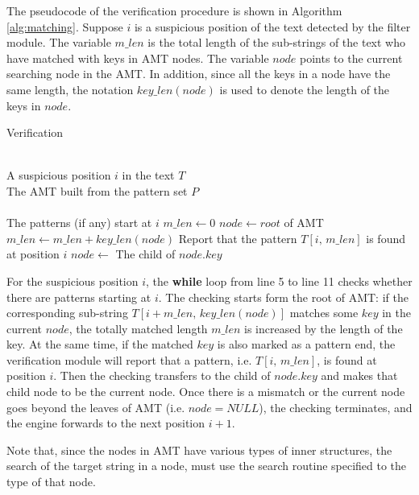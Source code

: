 \documentclass{article}
\begin{document}
The pseudocode of the verification procedure is shown in Algorithm
\ref{alg:matching}. Suppose $i$ is a suspicious position of the text
detected by the filter module. The variable $m\_len$ is the total
length of the sub-strings of the text who have matched with keys in
AMT nodes. The variable $node$ points to the current searching node in
the AMT. In addition, since all the keys in a node have the same
length, the notation $key\_len(node)$ is used to denote the length of
the keys in $node$.

\begin{algorithm}
  \caption{Verification}\scriptsize
  \label{alg:matching}
  \begin{algorithmic}[1]
    \REQUIRE ~~\\
    A suspicious position $i$ in the text $T$\\
    The AMT built from the pattern set $P$\\
    \ENSURE ~~\\
    The patterns (if any) start at $i$ 
    \STATE
    \STATE $m\_len \leftarrow 0$
    \STATE $node \leftarrow root$ of AMT
    \STATE
    \STATE $m\_len \leftarrow m\_len + key\_len(node)$
    \STATE Report that the pattern $T[i,\,m\_len]$ is found at position $i$
    \ENDIF
    \STATE $node \leftarrow$ The child of $node.key$
    \ENDWHILE
  \end{algorithmic}
\end{algorithm}

For the suspicious position $i$, the \textbf{while} loop from line 5
to line 11 checks whether there are patterns starting at $i$. The
checking starts form the root of AMT: if the corresponding sub-string
$T[i+m\_len, \, key\_len(node)]$ matches some $key$ in the current
$node$, the totally matched length $m\_len$ is increased by the length
of the key. At the same time, if the matched $key$ is also marked as a
pattern end, the verification module will report that a pattern,
i.e. $T[i,\,m\_len]$, is found at position $i$. Then the checking
transfers to the child of $node.key$ and makes that child node to be
the current node. Once there is a mismatch or the current node goes
beyond the leaves of AMT (i.e.  $node = NULL$), the checking
terminates, and the engine forwards to the next position $i+1$.

Note that, since the nodes in AMT have various types of inner
structures, the search of the target string in a node, must use the
search routine specified to the type of that node.
\end{document}
